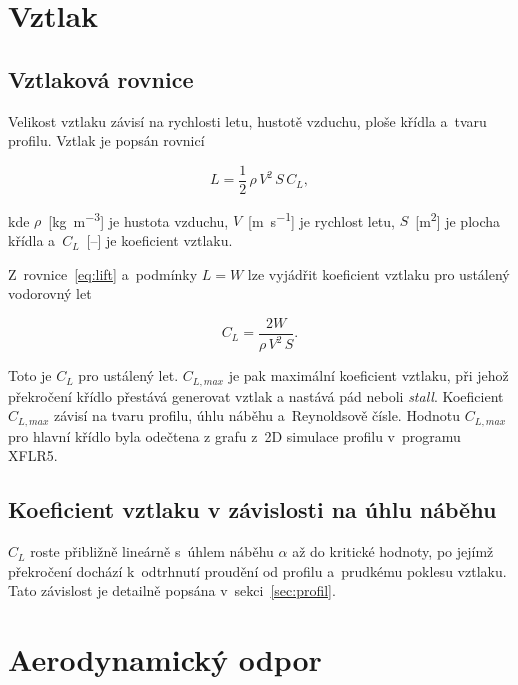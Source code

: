 \documentclass[12pt, a4paper, oneside]{report}
\begin{document}
\section{Vztlak}

\subsection{Vztlaková rovnice}

Velikost vztlaku závisí na rychlosti letu, hustotě vzduchu, ploše křídla
a~tvaru profilu. Vztlak je popsán rovnicí

\begin{equation}
    L = \frac{1}{2}\,\rho\,V^{2}\,S\,C_L,
    \label{eq:lift}
\end{equation}

kde $\rho$~[\si{\kilogram\per\cubic\metre}] je hustota vzduchu,
$V$~[\si{\metre\per\second}] je rychlost letu,
$S$~[\si{\square\metre}] je plocha křídla a~$C_L$~[--] je koeficient vztlaku.

Z~rovnice~\ref{eq:lift} a~podmínky $L = W$ lze vyjádřit koeficient vztlaku
pro ustálený vodorovný let

\begin{equation}
    C_L = \frac{2W}{\rho\,V^{2}\,S}.
    \label{eq:CL}
\end{equation}

Toto je $C_L$ pro ustálený let. $C_{L,max}$ je pak maximální koeficient
vztlaku, při jehož překročení křídlo přestává generovat vztlak a nastává pád neboli
\textit{stall}. Koeficient $C_{L,max}$ závisí na tvaru profilu, úhlu náběhu a~Reynoldsově čísle. 
Hodnotu $C_{L,max}$ pro hlavní křídlo byla odečtena z grafu z~2D simulace profilu v~programu XFLR5.
\subsection{Koeficient vztlaku v závislosti na úhlu náběhu}

$C_L$ roste přibližně lineárně s~úhlem náběhu $\alpha$ až do kritické hodnoty,
po jejímž překročení dochází k~odtrhnutí proudění od profilu a~prudkému
poklesu vztlaku. Tato závislost je detailně popsána v~sekci~\ref{sec:profil}.

\section{Aerodynamický odpor}
\end{document}
